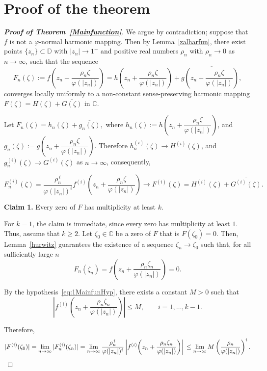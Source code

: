 \documentclass[10pt,a4paper]{amsart}
\numberwithin{equation}{section}
\begin{document}
\section{Proof of the theorem}
\begin{proof}[\bf{Proof of Theorem~\ref{Mainfunction}}]
 We argue by contradiction; suppose that $f$ is not a
$\varphi$-normal harmonic mapping. Then by Lemma~\ref{zalharfun},
there exist points
$\{z_n\}\subset\mathbb{D}$ with $|z_n|\to 1^-$ 
and positive real numbers 
$\rho_n$ with
$\rho_n\to 0$ as $n\to\infty$, such that the sequence
\begin{equation}\label{eq: zalharfun}
F_n(\zeta)
:=
f\!\left(
z_n+\frac{\rho_n\zeta}{\varphi(|z_n|)}
\right)
=
h\!\left(
z_n+\frac{\rho_n\zeta}{\varphi(|z_n|)}
\right)
+
\overline{
g\!\left(
z_n+\frac{\rho_n\zeta}{\varphi(|z_n|)}
\right),
}
\end{equation}
converges locally uniformly to
a non-constant
 sense-preserving harmonic mapping
$F(\zeta)=H(\zeta)+\overline{G(\zeta)}$ in $\mathbb{C}$.

Let
$
F_n(\zeta)=h_n(\zeta)+\overline{g_n(\zeta)},
$
where
$h_n(\zeta)
:=
h\!\left(
z_n+\dfrac{\rho_n\zeta}{\varphi(|z_n|)}
\right)$, and 
$g_n(\zeta)
:=
g\!\left(
z_n+\dfrac{\rho_n\zeta}{\varphi(|z_n|)}
\right).
$
Therefore
$
h_n^{(i)}(\zeta)\to H^{(i)}(\zeta)$,
and
$g_n^{(i)}(\zeta)\to G^{(i)}(\zeta)
$
as $n\to\infty$, consequently,

\[
F_n^{(i)}(\zeta)
=
\frac{\rho_n^{\,i}}{\varphi(|z_n|)^i}
f^{(i)}
\!\left(
z_n+\frac{\rho_n\zeta}{\varphi(|z_n|)}
\right)
\longrightarrow
F^{(i)}(\zeta)
=
H^{(i)}(\zeta)+\overline{G^{(i)}(\zeta)}.
\]
\smallskip 

\noindent
\textbf{Claim 1.}
Every zero of $F$ has multiplicity at least $k$.\smallskip

For $k=1$, the claim is immediate, since every zero has multiplicity at least $1$. 
Thus, assume that $k\ge2$.
 Let $\zeta_0\in\mathbb C$ be a zero of $F$ that is $F(\zeta_0)=0$.
Then, Lemma~\ref{hurwitz} guarantees the existence of
 a sequence
$\zeta_n\to\zeta_0$ such that, for all sufficiently large $n$
\[
F_n(\zeta_n)
=
f\!\left(
z_n+\frac{\rho_n\zeta_n}{\varphi(|z_n|)}
\right)
=0.
\]

By the hypothesis~\eqref{eq:1MainfunHyp}, there exists a
 constant $M>0$ such that
\[
\left|
f^{(i)}
\!\left(
z_n+\frac{\rho_n\zeta_n}{\varphi(|z_n|)}
\right)
\right|
\le M,
\qquad
i=1,\ldots,k-1.
\]

Therefore,
\begin{equation}\label{eq: fi0}
|F^{(i)}(\zeta_0)|
=
\lim_{n\to\infty}
|F_n^{(i)}(\zeta_n)|  \\
=
\lim_{n\to\infty}
\frac{\rho_n^{\,i}}
{\varphi(|z_n|)^i}
\left|f^{(i)}
\!\left(
z_n+\frac{\rho_n\zeta_n}{\varphi(|z_n|)}
\right)\right|     \\
\le
\lim_{n\to\infty}
M
\left(
\frac{\rho_n}{\varphi(|z_n|)}
\right)^i .
\end{equation}


\end{proof}
\end{document}
